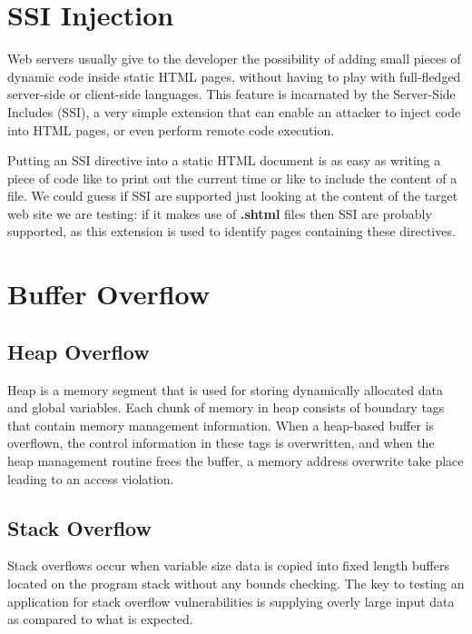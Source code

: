 \section{SSI Injection}
	Web servers usually give to the developer the possibility of adding small pieces of dynamic code 
	inside static HTML pages, without having to play with full-fledged server-side or client-side 
	languages. This feature is incarnated by the Server-Side Includes (SSI), a very simple extension 
	that can enable an attacker to inject code into HTML pages, or even perform remote
	code execution.

	Putting an SSI directive into a static HTML document is as easy as writing a piece of code like 
	to print out the current time or like to include the content of a file.
	We could guess if SSI are supported just looking at the content of the target web site we are testing: 
	if it makes use of {\bf .shtml} files then SSI are probably supported, as this extension is used to
	identify pages containing these directives.

\section{Buffer Overflow}

	\subsection{Heap Overflow}
		Heap is a memory segment that is used for storing dynamically allocated data and global 
		variables. Each chunk of memory in heap consists of boundary tags that contain memory 
		management information. When a heap-based buffer is overflown, the control information 
		in these tags is overwritten, and when the heap management routine frees the buffer, 
		a memory address overwrite take place leading to an access violation. 

	\subsection{Stack Overflow}
		Stack overflows occur when variable size data is copied into fixed length buffers located 
		on the program stack without any bounds checking. 
		The key to testing an application for stack overflow vulnerabilities is supplying overly 
		large input data as compared to what is expected. 
